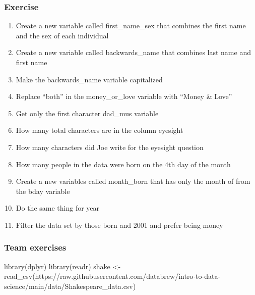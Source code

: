 \documentclass[
]{book}
\newenvironment{Shaded}{\begin{snugshade}}{\end{snugshade}}
\newcommand{\FunctionTok}[1]{\textcolor[rgb]{0.00,0.00,0.00}{#1}}
\newcommand{\NormalTok}[1]{#1}
\newcommand{\OtherTok}[1]{\textcolor[rgb]{0.56,0.35,0.01}{#1}}
\newcommand{\StringTok}[1]{\textcolor[rgb]{0.31,0.60,0.02}{#1}}
\begin{document}
\hypertarget{exercise-8}{%
\subsubsection*{Exercise}\label{exercise-8}}

\begin{enumerate}
\def\labelenumi{\arabic{enumi})}
\item
  Create a new variable called first\_name\_sex that combines the first name and the sex of each individual
\item
  Create a new variable called backwards\_name that combines last name and first name
\item
  Make the backwards\_name variable capitalized
\item
  Replace ``both'' in the money\_or\_love variable with ``Money \& Love''
\item
  Get only the first character dad\_mus variable
\item
  How many total characters are in the column eyesight
\item
  How many characters did Joe write for the eyesight question
\item
  How many people in the data were born on the 4th day of the month
\item
  Create a new variables called month\_born that has only the month of from the bday variable
\item
  Do the same thing for year
\item
  Filter the data set by those born and 2001 and prefer being money
\end{enumerate}

\hypertarget{team-exercises-1}{%
\subsubsection*{Team exercises}\label{team-exercises-1}}

\begin{Shaded}
\begin{Highlighting}[]

\FunctionTok{library}\NormalTok{(dplyr)}
\FunctionTok{library}\NormalTok{(readr)}
\NormalTok{shake }\OtherTok{\textless{}{-}} \FunctionTok{read\_csv}\NormalTok{(}\StringTok{\textquotesingle{}https://raw.githubusercontent.com/databrew/intro{-}to{-}data{-}science/main/data/Shakespeare\_data.csv\textquotesingle{}}\NormalTok{)}
\end{Highlighting}
\end{Shaded}
\end{document}
